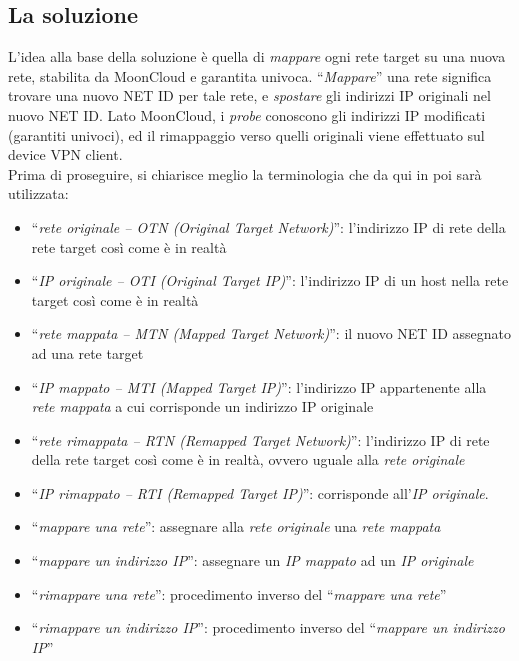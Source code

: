\subsection{La soluzione}
L'idea alla base della soluzione è quella di \textit{mappare} ogni rete target
su una nuova rete, stabilita da MoonCloud e garantita univoca.
``\textit{Mappare}'' una rete significa trovare una nuovo NET ID per tale rete, e
\textit{spostare} gli indirizzi IP originali nel nuovo NET ID. Lato MoonCloud, i
\textit{probe} conoscono gli indirizzi IP modificati (garantiti univoci), ed il rimappaggio
verso quelli originali viene effettuato sul device VPN client.\\
Prima di proseguire, si chiarisce meglio la terminologia che da qui in poi sarà utilizzata:
\begin{itemize}
  \item ``\textit{rete originale -- OTN (Original Target Network)}'': l'indirizzo IP di rete della rete target così come
  è in realtà
  \item ``\textit{IP originale -- OTI (Original Target IP)}'': l'indirizzo IP di un
  host nella rete target così
  come è in realtà
  \item ``\textit{rete mappata -- MTN (Mapped Target Network)}'': il nuovo NET ID
  assegnato ad una rete target
  \item ``\textit{IP mappato -- MTI (Mapped Target IP)}'': l'indirizzo IP appartenente alla \textit{rete
  mappata} a cui corrisponde un indirizzo IP originale
  \item ``\textit{rete rimappata -- RTN (Remapped Target Network)}'':  l'indirizzo
  IP di rete della rete target così
  come è in realtà, ovvero uguale alla \textit{rete originale}
  \item ``\textit{IP rimappato -- RTI (Remapped Target IP)}'': corrisponde all'\textit{IP originale}.
  \item ``\textit{mappare una rete}'': assegnare alla \textit{rete originale} una
  \textit{rete mappata}
  \item ``\textit{mappare un indirizzo IP}'': assegnare un \textit{IP mappato}
  ad un \textit{IP originale}
  \item ``\textit{rimappare una rete}'': procedimento inverso del
  ``\textit{mappare una rete}''
  \item ``\textit{rimappare un indirizzo IP}'': procedimento inverso del
  ``\textit{mappare un indirizzo IP}''
\end{itemize}
